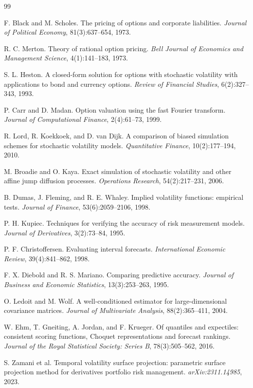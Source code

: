 \documentclass[11pt,a4paper]{article}
\begin{document}
\begin{thebibliography}{99}

F. Black and M. Scholes.
\newblock The pricing of options and corporate liabilities.
\newblock \emph{Journal of Political Economy}, 81(3):637--654, 1973.

R. C. Merton.
\newblock Theory of rational option pricing.
\newblock \emph{Bell Journal of Economics and Management Science}, 4(1):141--183, 1973.

S. L. Heston.
\newblock A closed-form solution for options with stochastic volatility with applications to bond
and currency options.
\newblock \emph{Review of Financial Studies}, 6(2):327--343, 1993.

P. Carr and D. Madan.
\newblock Option valuation using the fast Fourier transform.
\newblock \emph{Journal of Computational Finance}, 2(4):61--73, 1999.

R. Lord, R. Koekkoek, and D. van Dijk.
\newblock A comparison of biased simulation schemes for stochastic volatility models.
\newblock \emph{Quantitative Finance}, 10(2):177--194, 2010.

M. Broadie and O. Kaya.
\newblock Exact simulation of stochastic volatility and other affine jump diffusion processes.
\newblock \emph{Operations Research}, 54(2):217--231, 2006.

B. Dumas, J. Fleming, and R. E. Whaley.
\newblock Implied volatility functions: empirical tests.
\newblock \emph{Journal of Finance}, 53(6):2059--2106, 1998.

P. H. Kupiec.
\newblock Techniques for verifying the accuracy of risk measurement models.
\newblock \emph{Journal of Derivatives}, 3(2):73--84, 1995.

P. F. Christoffersen.
\newblock Evaluating interval forecasts.
\newblock \emph{International Economic Review}, 39(4):841--862, 1998.

F. X. Diebold and R. S. Mariano.
\newblock Comparing predictive accuracy.
\newblock \emph{Journal of Business and Economic Statistics}, 13(3):253--263, 1995.

O. Ledoit and M. Wolf.
\newblock A well-conditioned estimator for large-dimensional covariance matrices.
\newblock \emph{Journal of Multivariate Analysis}, 88(2):365--411, 2004.

W. Ehm, T. Gneiting, A. Jordan, and F. Krueger.
\newblock Of quantiles and expectiles: consistent scoring functions, Choquet representations and
forecast rankings.
\newblock \emph{Journal of the Royal Statistical Society: Series B}, 78(3):505--562, 2016.

S. Zamani et al.
\newblock Temporal volatility surface projection: parametric surface projection method for
derivatives portfolio risk management.
\newblock \emph{arXiv:2311.14985}, 2023.

\end{thebibliography}
\end{document}
